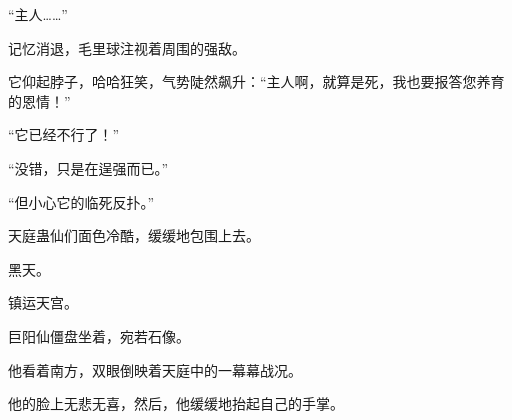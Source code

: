 \begin{this_body}
“主人……”

记忆消退，毛里球注视着周围的强敌。

它仰起脖子，哈哈狂笑，气势陡然飙升：“主人啊，就算是死，我也要报答您养育的恩情！”

“它已经不行了！”

“没错，只是在逞强而已。”

“但小心它的临死反扑。”

天庭蛊仙们面色冷酷，缓缓地包围上去。

黑天。

镇运天宫。

巨阳仙僵盘坐着，宛若石像。

他看着南方，双眼倒映着天庭中的一幕幕战况。

他的脸上无悲无喜，然后，他缓缓地抬起自己的手掌。

\end{this_body}

